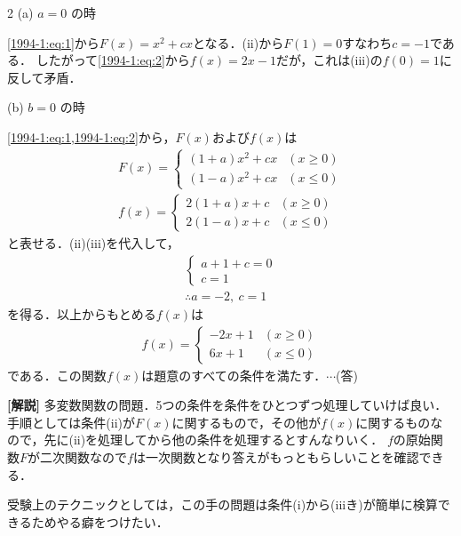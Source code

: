 \documentclass[../../main.tex]{subfiles}
\begin{document}
\begin{multicols}{2}
  \vspace{1em} %
  (a) $a=0$ の時

  \cref{1994-1:eq:1}から$F(x)=x^2 + cx$となる．(ii)から$F(1)=0$すなわち$c=-1$である．
  したがって\cref{1994-1:eq:2}から$f(x)=2x-1$だが，これは(iii)の$f(0)=1$に反して矛盾．

  \vspace{1em} %
  (b) $b=0$ の時

  \cref{1994-1:eq:1,1994-1:eq:2}から，$F(x)$および$f(x)$は
  \begin{align*}
    F(x) = \begin{cases}
             (1+a)x^2 + cx & (x \ge 0) \\
             (1-a)x^2 + cx & (x \le 0)
           \end{cases} \\
    f(x) = \begin{cases}
             2(1+a)x + c & (x \ge 0) \\
             2(1-a)x + c & (x \le 0)
           \end{cases}
  \end{align*}
  と表せる．(ii)(iii)を代入して，
  \begin{align*}
    \begin{cases}
      a+1+c = 0 \\
      c=1
    \end{cases} \\
    \therefore a = -2, \ c=1
  \end{align*}
  を得る．以上からもとめる$f(x)$は
  \begin{align*}
    f(x) = \begin{cases}
             -2x+1 & (x \ge 0) \\
             6x+1  & (x \le 0)
           \end{cases}
  \end{align*}
  である．この関数$f(x)$は題意のすべての条件を満たす．$\cdots$(答)

  \vspace{10pt}
  {\bf[解説]}
  多変数関数の問題．5つの条件を条件をひとつずつ処理していけば良い．
  手順としては条件(ii)が$F(x)$に関するもので，その他が$f(x)$に関するものなので，先に(ii)を処理してから他の条件を処理するとすんなりいく．
  $f$の原始関数$F$が二次関数なので$f$は一次関数となり答えがもっともらしいことを確認できる．

  受験上のテクニックとしては，この手の問題は条件(i)から(iiiき)が簡単に検算できるためやる癖をつけたい．

  \newpage
\end{multicols}
\end{document}
